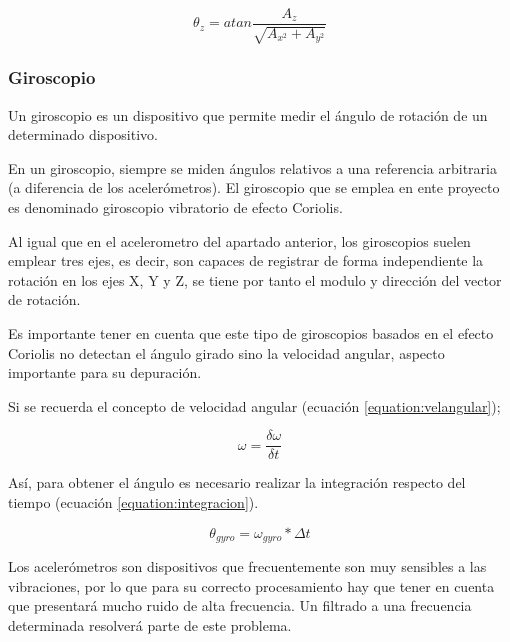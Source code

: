 \begin{equation}
\theta_{z} = atan\frac{A_{z}}{\sqrt{A_{x^2}+A_{y^2}}}
\end{equation}

\subsubsection{Giroscopio}
Un giroscopio es un dispositivo que permite medir el ángulo de rotación de un determinado dispositivo. \newline

En un giroscopio, siempre se miden ángulos relativos a una referencia arbitraria (a diferencia de los acelerómetros). El giroscopio que se emplea en ente proyecto es denominado giroscopio vibratorio de efecto Coriolis. \newline

Al igual que en el acelerometro del apartado anterior, los giroscopios suelen emplear tres ejes, es decir, son capaces de registrar de forma independiente la rotación en los ejes X, Y y Z, se tiene por tanto el modulo y dirección del vector de rotación. \newline

Es importante tener en cuenta que este tipo de giroscopios basados en el efecto Coriolis no detectan el ángulo girado sino la velocidad angular, aspecto importante para su depuración. \newline

Si se recuerda el concepto de velocidad angular (ecuación \ref{equation:velangular});

\begin{equation} \label{equation:velangular}
	\omega = \frac{\delta \omega}{\delta t}
\end{equation}

Así, para obtener el ángulo es necesario realizar la integración respecto del tiempo (ecuación \ref{equation:integracion}).

\begin{equation}\label{equation:integracion}
	\theta_{gyro} = \omega_{gyro}*\Delta t
\end{equation}

Los acelerómetros son dispositivos que frecuentemente son muy sensibles a las vibraciones, por lo que para su correcto procesamiento hay que tener en cuenta que presentará mucho ruido de alta frecuencia. Un filtrado a una frecuencia determinada resolverá parte de este problema.\newline

